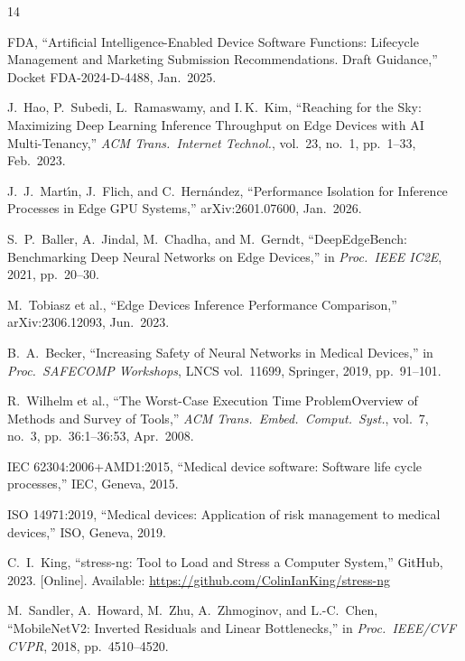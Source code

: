\documentclass[journal,twoside,9pt]{IEEEtran}
\begin{document}
\balance
\begin{thebibliography}{14}

FDA, ``Artificial Intelligence-Enabled Device Software Functions: Lifecycle Management
and Marketing Submission Recommendations. Draft Guidance,''
Docket FDA-2024-D-4488, Jan.\ 2025.

J.~Hao, P.~Subedi, L.~Ramaswamy, and I.\,K.~Kim, ``Reaching for the Sky: Maximizing
Deep Learning Inference Throughput on Edge Devices with AI Multi-Tenancy,''
\textit{ACM Trans.\ Internet Technol.}, vol.\ 23, no.\ 1, pp.\ 1--33, Feb.\ 2023.

J.~J.~Mart\'{\i}n, J.~Flich, and C.~Hern\'{a}ndez,
``Performance Isolation for Inference Processes in Edge GPU Systems,''
arXiv:2601.07600, Jan.\ 2026.

S.~P.\ Baller, A.\ Jindal, M.\ Chadha, and M.\ Gerndt,
``DeepEdgeBench: Benchmarking Deep Neural Networks on Edge Devices,''
in \textit{Proc.\ IEEE IC2E}, 2021, pp.\ 20--30.

M.\ Tobiasz et al., ``Edge Devices Inference Performance Comparison,''
arXiv:2306.12093, Jun.\ 2023.

B.~A.\ Becker, ``Increasing Safety of Neural Networks in Medical Devices,''
in \textit{Proc.\ SAFECOMP Workshops}, LNCS vol.\ 11699, Springer, 2019,
pp.\ 91--101.

R.\ Wilhelm et al., ``The Worst-Case Execution Time Problem\textemdash{}Overview of Methods
and Survey of Tools,'' \textit{ACM Trans.\ Embed.\ Comput.\ Syst.}, vol.\ 7, no.\ 3,
pp.\ 36:1--36:53, Apr.\ 2008.

IEC 62304:2006+AMD1:2015, ``Medical device software: Software life cycle processes,''
IEC, Geneva, 2015.

ISO 14971:2019, ``Medical devices: Application of risk management to medical devices,''
ISO, Geneva, 2019.

C.~I.\ King, ``stress-ng: Tool to Load and Stress a Computer System,''
GitHub, 2023. [Online]. Available: \url{https://github.com/ColinIanKing/stress-ng}

M.\ Sandler, A.\ Howard, M.\ Zhu, A.\ Zhmoginov, and L.-C.\ Chen,
``MobileNetV2: Inverted Residuals and Linear Bottlenecks,''
in \textit{Proc.\ IEEE/CVF CVPR}, 2018, pp.\ 4510--4520.


\end{thebibliography}
\end{document}

